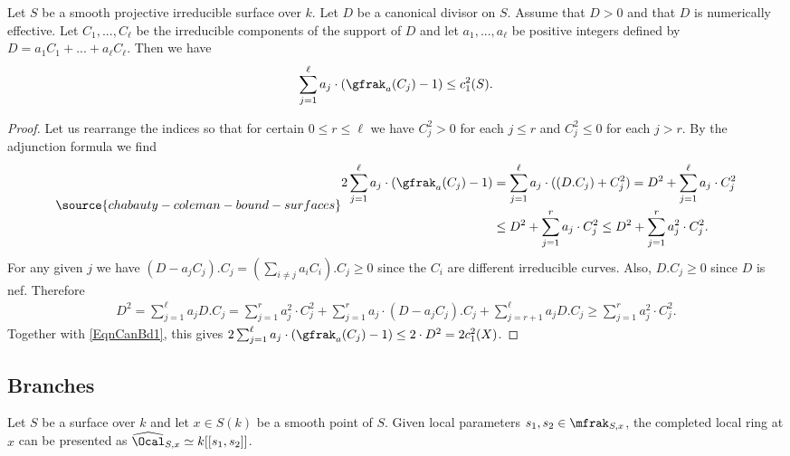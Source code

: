 \begin{lemma}
\notready \label{LemmaCanonicalGenusBd} Let $S$ be a smooth projective irreducible surface over $k$. Let $D$ be a canonical divisor on $S$. Assume that $D>0$ and that $D$ is numerically effective. Let $C_1,...,C_\ell$ be the irreducible components of the support of $D$ and let $a_1,...,a_\ell$ be positive integers defined by $D=a_1C_1 +...+a_\ell C_\ell$. Then we have
$$
\sum_{j=1}^\ell a_j\cdot (\gfrak_a(C_j)-1)\le c_1^2(S).
$$
\end{lemma}
\begin{proof} Let us rearrange the indices so that for certain $0\le r\le \ell$ we have $C_j^2>0$ for each $j\le r$ and $C_j^2\le 0$ for each $j>r$. By the adjunction formula we find
\begin{equation} \label{EqnCanBd1}
\source{chabauty-coleman-bound-surfaces}
\begin{aligned}
2\sum_{j=1}^\ell a_j\cdot (\gfrak_a(C_j)-1)&=\sum_{j=1}^\ell a_j\cdot ((D.C_j) +C_j^2) = D^2 + \sum_{j=1}^\ell a_j\cdot  C_j^2\\
&\le D^2 + \sum_{j=1}^r a_j \cdot C_j^2 \le D^2 + \sum_{j=1}^r a_j^2 \cdot C_j^2.
\end{aligned}
\end{equation}
For any given $j$ we have $(D-a_jC_j).C_j=(\sum_{i\ne j} a_iC_i).C_j\ge 0$ since the $C_i$ are different irreducible curves. Also, $D.C_j\ge 0$ since $D$ is nef. Therefore
$$
\begin{aligned}
D^2=\sum_{j=1}^\ell a_j D.C_j = \sum_{j=1}^r a_j^2 \cdot C_j^2 + \sum_{j=1}^r  a_j\cdot (D-a_jC_j).C_j + \sum_{j=r+1}^\ell a_j D.C_j\ge \sum_{j=1}^r a_j^2 \cdot C_j^2 .
\end{aligned}
$$
Together with \eqref{EqnCanBd1}, this gives $2\sum_{j=1}^\ell a_j\cdot (\gfrak_a(C_j)-1)\le 2\cdot D^2=2c_1^2(X)$.
\end{proof}


\subsection{Branches} Let $S$ be a surface over $k$ and let $x\in S(k)$ be a smooth point of $S$. Given local parameters $s_1,s_2\in \mfrak_{S,x}$, the completed local ring at $x$ can be presented as $\widehat{\Ocal}_{S,x}\simeq  k[[s_1,s_2]]$.


